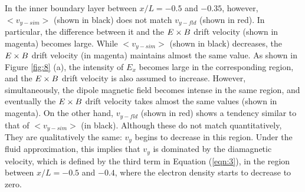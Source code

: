 \documentclass[draft,jgrga]{agutex2015}
\begin{document}
\begin{article}
In the inner boundary layer between $x/L=-0.5$ and $-0.35$, 
however,
$<v_{y-sim}>$ (shown in black) does not match 
$v_{y-fld}$ (shown in red).
%
%
In particular, the difference between it and the $\mbox{\boldmath $E$} \times \mbox{\boldmath $B$}$ drift velocity (shown in magenta)
becomes large.
While $<v_{y-sim}>$ (shown in black) decreases,
the $\mbox{\boldmath $E$} \times \mbox{\boldmath $B$}$ drift velocity
(in magenta) maintains almost the same value. 
As shown in Figure \ref{fig:8} (a), the intensity of $E_x$ becomes large 
in the corresponding region, and 
the $\mbox{\boldmath $E$} \times \mbox{\boldmath $B$}$ drift velocity
is also assumed to increase. 
However, simultaneously, the dipole magnetic field becomes intense 
in the same region, and eventually 
the $\mbox{\boldmath $E$} \times \mbox{\boldmath $B$}$ drift velocity
takes almost the same values (shown in magenta).
On the other hand, 
$v_{y-fld}$ (shown in red) shows a tendency similar to that of 
$<v_{y-sim}>$ (in black).
Although these do not match quantitatively,
They are qualitatively the same: $v_y$ begins to decrease 
in this region.
Under the fluid approximation, this implies that 
$v_y$ is dominated by the diamagnetic velocity, which is defined by 
the third term in Equation (\ref{eqn:3}),
in the region between $x/L =-0.5$ and $-0.4$, 
where the electron density starts to decrease to zero. 


\end{article}
\end{document}
